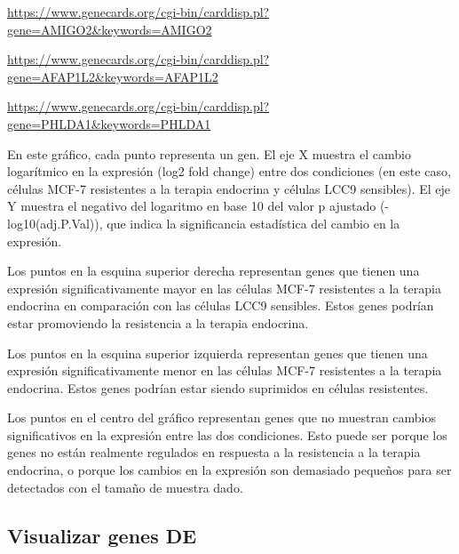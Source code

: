 \documentclass[
]{article}
\begin{document}
\url{https://www.genecards.org/cgi-bin/carddisp.pl?gene=AMIGO2&keywords=AMIGO2}

\url{https://www.genecards.org/cgi-bin/carddisp.pl?gene=AFAP1L2&keywords=AFAP1L2}

\url{https://www.genecards.org/cgi-bin/carddisp.pl?gene=PHLDA1&keywords=PHLDA1}

En este gráfico, cada punto representa un gen. El eje X muestra el
cambio logarítmico en la expresión (log2 fold change) entre dos
condiciones (en este caso, células MCF-7 resistentes a la terapia
endocrina y células LCC9 sensibles). El eje Y muestra el negativo del
logaritmo en base 10 del valor p ajustado (-log10(adj.P.Val)), que
indica la significancia estadística del cambio en la expresión.

Los puntos en la esquina superior derecha representan genes que tienen
una expresión significativamente mayor en las células MCF-7 resistentes
a la terapia endocrina en comparación con las células LCC9 sensibles.
Estos genes podrían estar promoviendo la resistencia a la terapia
endocrina.

Los puntos en la esquina superior izquierda representan genes que tienen
una expresión significativamente menor en las células MCF-7 resistentes
a la terapia endocrina. Estos genes podrían estar siendo suprimidos en
células resistentes.

Los puntos en el centro del gráfico representan genes que no muestran
cambios significativos en la expresión entre las dos condiciones. Esto
puede ser porque los genes no están realmente regulados en respuesta a
la resistencia a la terapia endocrina, o porque los cambios en la
expresión son demasiado pequeños para ser detectados con el tamaño de
muestra dado.

\subsection{Visualizar genes DE}\label{visualizar-genes-de}
\end{document}
